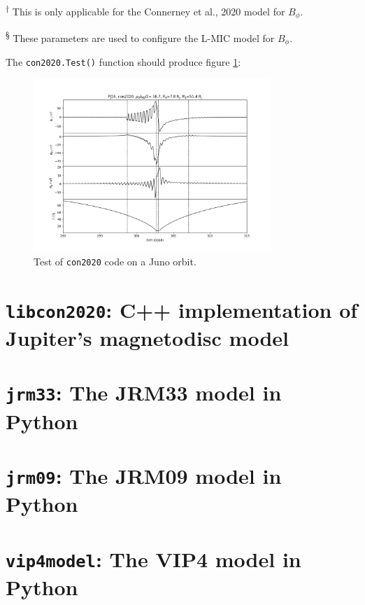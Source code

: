 	\textsuperscript{†} This is only applicable for the Connerney et al., 2020 model for $B_{\phi}$.
	
	\textsuperscript{§} These parameters are used to configure the L-MIC model for $B_{\phi}$.
	
	The \texttt{con2020.Test()} function should produce figure \ref{Figcon20202Test}:
	
	\begin{figure}
		\centering\includegraphics[width=0.8\textwidth]{figures/ch3_con2020Test.png}
		\caption{Test of \texttt{con2020} code on a Juno orbit.\label{Figcon20202Test}}
	\end{figure}


	\section{\texttt{libcon2020}: C++ implementation of Jupiter's magnetodisc model}

	\section{\texttt{jrm33}: The JRM33 model in Python}

	\section{\texttt{jrm09}: The JRM09 model in Python}

	\section{\texttt{vip4model}: The VIP4 model in Python}
	